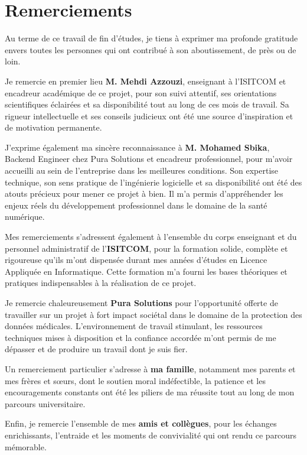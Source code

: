 \chapter*{Remerciements}
\thispagestyle{empty}

Au terme de ce travail de fin d'études, je tiens à exprimer ma profonde gratitude envers toutes les personnes qui ont contribué à son aboutissement, de près ou de loin.

Je remercie en premier lieu \textbf{M. Mehdi Azzouzi}, enseignant à l'ISITCOM et encadreur académique de ce projet, pour son suivi attentif, ses orientations scientifiques éclairées et sa disponibilité tout au long de ces mois de travail. Sa rigueur intellectuelle et ses conseils judicieux ont été une source d'inspiration et de motivation permanente.

J'exprime également ma sincère reconnaissance à \textbf{M. Mohamed Sbika}, Backend Engineer chez Pura Solutions et encadreur professionnel, pour m'avoir accueilli au sein de l'entreprise dans les meilleures conditions. Son expertise technique, son sens pratique de l'ingénierie logicielle et sa disponibilité ont été des atouts précieux pour mener ce projet à bien. Il m'a permis d'appréhender les enjeux réels du développement professionnel dans le domaine de la santé numérique.

Mes remerciements s'adressent également à l'ensemble du corps enseignant et du personnel administratif de l'\textbf{ISITCOM}, pour la formation solide, complète et rigoureuse qu'ils m'ont dispensée durant mes années d'études en Licence Appliquée en Informatique. Cette formation m'a fourni les bases théoriques et pratiques indispensables à la réalisation de ce projet.

Je remercie chaleureusement \textbf{Pura Solutions} pour l'opportunité offerte de travailler sur un projet à fort impact sociétal dans le domaine de la protection des données médicales. L'environnement de travail stimulant, les ressources techniques mises à disposition et la confiance accordée m'ont permis de me dépasser et de produire un travail dont je suis fier.

Un remerciement particulier s'adresse à \textbf{ma famille}, notamment mes parents et mes frères et sœurs, dont le soutien moral indéfectible, la patience et les encouragements constants ont été les piliers de ma réussite tout au long de mon parcours universitaire.

Enfin, je remercie l'ensemble de mes \textbf{amis et collègues}, pour les échanges enrichissants, l'entraide et les moments de convivialité qui ont rendu ce parcours mémorable.

\newpage

